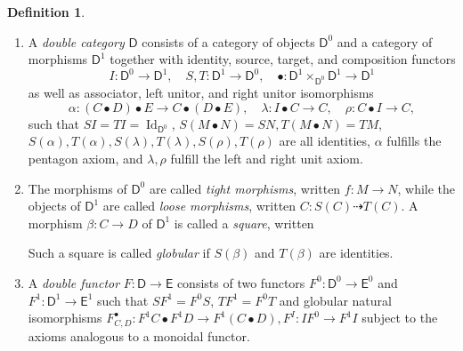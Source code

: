 \documentclass[11pt]{report}
\theoremstyle{definition}
\newtheorem{definition}[theorem]{Definition}
\theoremstyle{remark}
\theoremstyle{remark}
\begin{document}
\begin{definition}
\begin{enumerate}[label=(\roman*)]
\item A \emph{double category} $\mathsf{D}$ consists of a category of objects $\mathsf{D}^0$ and a category of morphisms $\mathsf{D}^1$ together with identity, source, target, and composition functors
\begin{equation*}
I: \mathsf{D}^0 \to \mathsf{D}^1, \quad S,T: \mathsf{D}^1 \to \mathsf{D}^0, \quad \bullet: \mathsf{D}^1 \times_{\mathsf{D}^0} \mathsf{D}^1 \to \mathsf{D}^1
\end{equation*}
as well as associator, left unitor, and right unitor isomorphisms
\begin{equation*}
\alpha: (C \bullet D) \bullet E \to C \bullet (D \bullet E), \quad \lambda: I \bullet C \to C, \quad \rho: C \bullet I \to C,
\end{equation*}
such that $SI = TI = \operatorname{Id}_{\mathsf{D}^0}$, $S(M \bullet N) = SN, T(M \bullet N) = TM$, $S(\alpha), T(\alpha), S(\lambda), T(\lambda), S(\rho), T(\rho)$ are all identities, $\alpha$ fulfills the pentagon axiom, and $\lambda, \rho$ fulfill the left and right unit axiom.
\item The morphisms of $\mathsf{D}^0$ are called \emph{tight morphisms}, written $f: M \to N$, while the objects of $\mathsf{D}^1$ are called \emph{loose morphisms}, written $C: S(C) \dashrightarrow T(C)$. A morphism $\beta: C \to D$ of $\mathsf{D}^1$ is called a \emph{square}, written
\begin{center}
\end{center}
Such a square is called \emph{globular} if $S(\beta)$ and $T(\beta)$ are identities.
\item A \emph{double functor} $F: \mathsf{D} \to \mathsf{E}$ consists of two functors $F^0: \mathsf{D}^0 \to \mathsf{E}^0$ and $F^1: \mathsf{D}^1 \to \mathsf{E}^1$ such that $SF^1 = F^0S$, $TF^1 = F^0T$ and globular natural isomorphisms $F_{C,D}^\bullet: F^1 C \bullet F^1 D \to F^1(C \bullet D), F^I: IF^0 \to F^1 I$ subject to the axioms analogous to a monoidal functor.
\end{enumerate}
\end{definition}
\end{document}
